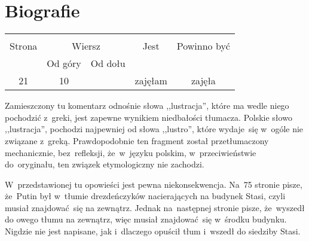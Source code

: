 \documentclass[a4paper,11pt]{article}
\begin{document}
\section{Biografie}

\vspace{\spaceTwo}





\begin{center}
  \begin{tabular}{|c|c|c|c|c|}
    \hline
    & \multicolumn{2}{c|}{} & & \\
    Strona & \multicolumn{2}{c|}{Wiersz} & Jest
                              & Powinno być \\ \cline{2-3}
    & Od góry & Od dołu & & \\
    \hline
    21 & 10 & & zajęłam & zajęła \\
    \hline
  \end{tabular}
\end{center}

\vspace{\spaceTwo}








\start {} Zamieszczony tu komentarz odnośnie słowa
,,lustracja'', które ma wedle niego pochodzić z~greki, jest zapewne
wynikiem niedbałości tłumacza. Polskie słowo ,,lustracja'', pochodzi
najpewniej od słowa ,,lustro'', które wydaje~się w~ogóle nie związane
z~greką. Prawdopodobnie ten fragment został przetłumaczony
mechanicznie, bez~refleksji, że~w~języku polskim, w~przeciwieństwie
do~oryginału, ten związek etymologiczny nie zachodzi.

\vspace{\spaceFour}


\start {} W~przedstawionej tu opowieści jest pewna
niekonsekwencja. Na~75 stronie pisze, że~Putin był w~tłumie
drezdeńczyków nacierających na budynek Stasi, czyli musiał
znajdować~się na zewnątrz. Jednak na~następnej stronie pisze,
że~wyszedł do owego tłumu na zewnątrz, więc musiał znajdować~się
w~środku budynku. Nigdzie nie jest napisane, jak i~dlaczego opuścił
tłum i~wszedł do siedziby Stasi.
\end{document}
